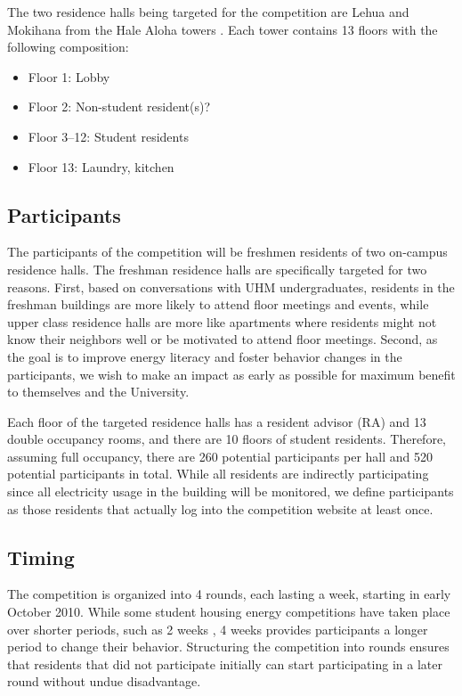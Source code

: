 The two residence halls being targeted for the competition are Lehua and Mokihana from the Hale Aloha towers \cite{hale-aloha-website}. Each tower contains 13 floors with the following composition:

\begin{itemize}
	\item Floor 1: Lobby
	\item Floor 2: Non-student resident(s)?
	\item Floor 3--12: Student residents
	\item Floor 13: Laundry, kitchen
\end{itemize}

\subsection{Participants}

The participants of the competition will be freshmen residents of two on-campus residence halls. The freshman residence halls are specifically targeted for two reasons. First, based on conversations with UHM undergraduates, residents in the freshman buildings are more likely to attend floor meetings and events, while upper class residence halls are more like apartments where residents might not know their neighbors well or be motivated to attend floor meetings. Second, as the goal is to improve energy literacy and foster behavior changes in the participants, we wish to make an impact as early as possible for maximum benefit to themselves and the University.

Each floor of the targeted residence halls has a resident advisor (RA) and 13 double occupancy rooms, and there are 10 floors of student residents. Therefore, assuming full occupancy, there are 260 potential participants per hall and 520 potential participants in total. While all residents are indirectly participating since all electricity usage in the building will be monitored, we define participants as those residents that actually log into the competition website at least once.

\subsection{Timing}

The competition is organized into 4 rounds, each lasting a week, starting in early October 2010. While some student housing energy competitions have taken place over shorter periods, such as 2 weeks \cite{petersen-dorm-energy-reduction}, 4 weeks provides participants a longer period to change their behavior. Structuring the competition into rounds ensures that residents that did not participate initially can start participating in a later round without undue disadvantage.

